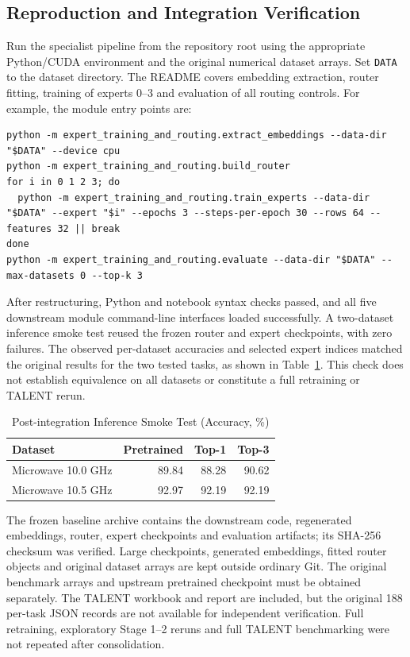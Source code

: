 \documentclass[conference]{IEEEtran}
\begin{document}
\subsection{Reproduction and Integration Verification}
Run the specialist pipeline from the repository root using the appropriate Python/CUDA environment and the original numerical dataset arrays. Set \texttt{DATA} to the dataset directory. The README covers embedding extraction, router fitting, training of experts 0--3 and evaluation of all routing controls. For example, the module entry points are:
\begin{lstlisting}[basicstyle=\ttfamily\scriptsize,breaklines=true,frame=single]
python -m expert_training_and_routing.extract_embeddings --data-dir "$DATA" --device cpu
python -m expert_training_and_routing.build_router
for i in 0 1 2 3; do
  python -m expert_training_and_routing.train_experts --data-dir "$DATA" --expert "$i" --epochs 3 --steps-per-epoch 30 --rows 64 --features 32 || break
done
python -m expert_training_and_routing.evaluate --data-dir "$DATA" --max-datasets 0 --top-k 3
\end{lstlisting}
After restructuring, Python and notebook syntax checks passed, and all five downstream module command-line interfaces loaded successfully. A two-dataset inference smoke test reused the frozen router and expert checkpoints, with zero failures. The observed per-dataset accuracies and selected expert indices matched the original results for the two tested tasks, as shown in Table~\ref{tab:smoke}. This check does not establish equivalence on all datasets or constitute a full retraining or TALENT rerun.
\begin{table}[t]
\caption{Post-integration Inference Smoke Test (Accuracy, \%)}
\label{tab:smoke}
\centering\footnotesize
\begin{tabular}{lrrr}\toprule
Dataset & Pretrained & Top-1 & Top-3\\\midrule
Microwave 10.0 GHz & 89.84 & 88.28 & 90.62\\
Microwave 10.5 GHz & 92.97 & 92.19 & 92.19\\\bottomrule
\end{tabular}
\end{table}
The frozen baseline archive contains the downstream code, regenerated embeddings, router, expert checkpoints and evaluation artifacts; its SHA-256 checksum was verified. Large checkpoints, generated embeddings, fitted router objects and original dataset arrays are kept outside ordinary Git. The original benchmark arrays and upstream pretrained checkpoint must be obtained separately. The TALENT workbook and report are included, but the original 188 per-task JSON records are not available for independent verification. Full retraining, exploratory Stage 1--2 reruns and full TALENT benchmarking were not repeated after consolidation.
\end{document}
